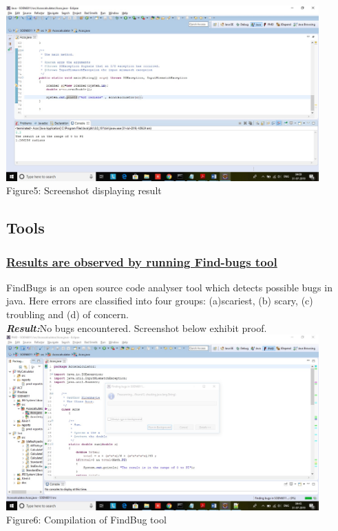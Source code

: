 \documentclass[a4paper,12pt]{article}
\begin{document}
\begin{titlepage}
\newline
\includegraphics[width=12.0cm]{F5.jpg}\\
Figure5: Screenshot displaying result \\
\newline
\subsection{Tools}
\subsubsection{\underline{\textbf{Results are observed by running Find-bugs tool}}}
FindBugs is an open source code analyser tool which detects possible bugs in java. Here errors are classified into four groups: (a)scariest, (b) scary, (c) troubling and (d) of concern.\\
\textbf{\textit{Result:}}No bugs encountered. Screenshot below exhibit proof.\\
\newline
\includegraphics[width=12.0cm]{F6.jpg}\\
Figure6: Compilation of FindBug tool \\


\end{titlepage}
\end{document}

